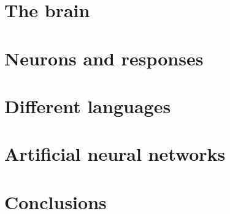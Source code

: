 \section{The brain}

\section{Neurons and responses}

\section{Different languages}

\section{Artificial neural networks}

\section{Conclusions}

